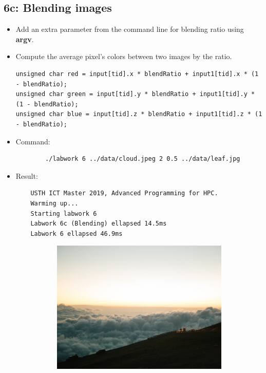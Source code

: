 \documentclass{article}
\begin{document}
\subsection{6c: Blending images }
\begin{itemize}
    \item Add an extra parameter from the command line for blending ratio using \textbf{argv}.
    \item Compute the average pixel's colors between two images by the ratio.
    \begin{verbatim}
unsigned char red = input[tid].x * blendRatio + input1[tid].x * (1 - blendRatio);
unsigned char green = input[tid].y * blendRatio + input1[tid].y * (1 - blendRatio);
unsigned char blue = input[tid].z * blendRatio + input1[tid].z * (1 - blendRatio);
    \end{verbatim}
    \item Command:
    \begin{verbatim}
        ./labwork 6 ../data/cloud.jpeg 2 0.5 ../data/leaf.jpg 
    \end{verbatim}
    \item Result:
    \begin{verbatim}
    USTH ICT Master 2019, Advanced Programming for HPC.
    Warming up...
    Starting labwork 6
    Labwork 6c (Blending) ellapsed 14.5ms
    Labwork 6 ellapsed 46.9ms
    \end{verbatim}
    \begin{figure}[h]
      \centering
      \begin{subfigure}{.45\textwidth}
        \includegraphics[width=\linewidth]{./result/cloud.jpeg}

\end{subfigure}
\end{figure}
\end{itemize}
\end{document}
